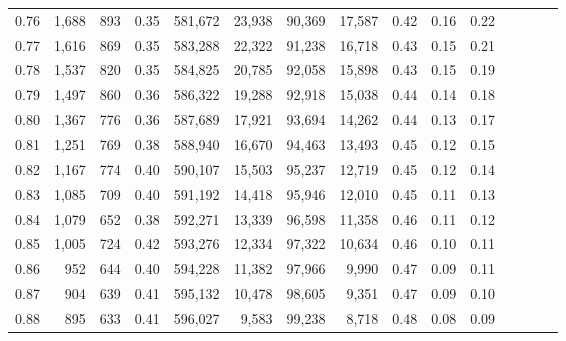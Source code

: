 \begin{tabular}{rrrcrrrrrrrrrrr}
0.76 &   1,688 &    893 &                                       0.35 &  581,672 &   23,938 &   90,369 &   17,587 &  0.42 &  0.16 &                         0.22 \\
0.77 &   1,616 &    869 &                                       0.35 &  583,288 &   22,322 &   91,238 &   16,718 &  0.43 &  0.15 &                         0.21 \\
0.78 &   1,537 &    820 &                                       0.35 &  584,825 &   20,785 &   92,058 &   15,898 &  0.43 &  0.15 &                         0.19 \\
0.79 &   1,497 &    860 &                                       0.36 &  586,322 &   19,288 &   92,918 &   15,038 &  0.44 &  0.14 &                         0.18 \\
0.80 &   1,367 &    776 &                                       0.36 &  587,689 &   17,921 &   93,694 &   14,262 &  0.44 &  0.13 &                         0.17 \\
0.81 &   1,251 &    769 &                                       0.38 &  588,940 &   16,670 &   94,463 &   13,493 &  0.45 &  0.12 &                         0.15 \\
0.82 &   1,167 &    774 &                                       0.40 &  590,107 &   15,503 &   95,237 &   12,719 &  0.45 &  0.12 &                         0.14 \\
0.83 &   1,085 &    709 &                                       0.40 &  591,192 &   14,418 &   95,946 &   12,010 &  0.45 &  0.11 &                         0.13 \\
0.84 &   1,079 &    652 &                                       0.38 &  592,271 &   13,339 &   96,598 &   11,358 &  0.46 &  0.11 &                         0.12 \\
0.85 &   1,005 &    724 &                                       0.42 &  593,276 &   12,334 &   97,322 &   10,634 &  0.46 &  0.10 &                         0.11 \\
0.86 &     952 &    644 &                                       0.40 &  594,228 &   11,382 &   97,966 &    9,990 &  0.47 &  0.09 &                         0.11 \\
0.87 &     904 &    639 &                                       0.41 &  595,132 &   10,478 &   98,605 &    9,351 &  0.47 &  0.09 &                         0.10 \\
0.88 &     895 &    633 &                                       0.41 &  596,027 &    9,583 &   99,238 &    8,718 &  0.48 &  0.08 &                         0.09 \\

\end{tabular}
